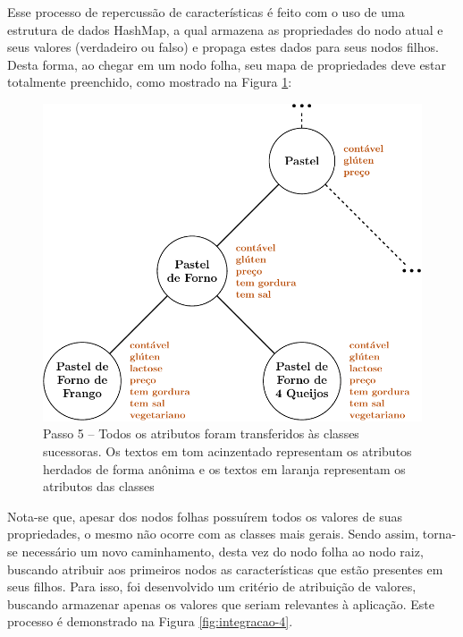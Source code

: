 Esse processo de repercussão de características é feito com o uso de uma estrutura de dados HashMap, a qual armazena as propriedades do nodo atual e seus valores (verdadeiro ou falso) e propaga estes dados para seus nodos filhos. Desta forma, ao chegar em um nodo folha, seu mapa de propriedades deve estar totalmente preenchido, como mostrado na Figura \ref{fig:integracao-3}:

\begin{figure}[H]
	\centering
	\caption[Integração da Ontologia -- Passo 5]{Passo 5 -- Todos os atributos foram transferidos às classes sucessoras. Os textos em tom acinzentado representam os atributos herdados de forma anônima e os textos em laranja representam os atributos das classes}
	\label{fig:integracao-3}
	\includegraphics[width=0.55\linewidth]{./pdf/tikz/topdown-5.pdf}
\end{figure}

Nota-se que, apesar dos nodos folhas possuírem todos os valores de suas propriedades, o mesmo não ocorre com as classes mais gerais. Sendo assim, torna-se necessário um novo caminhamento, desta vez do nodo folha ao nodo raiz, buscando atribuir aos primeiros nodos as características que estão presentes em seus filhos. Para isso, foi desenvolvido um critério de atribuição de valores, buscando armazenar apenas os valores que seriam relevantes à aplicação. Este processo é demonstrado na Figura \ref{fig:integracao-4}. 

